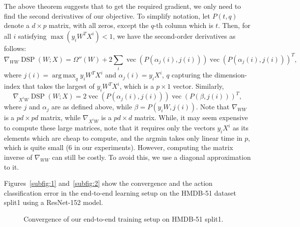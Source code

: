 \documentclass[runningheads]{llncs}
\DeclareMathOperator*{\dsp}{DSP}
\DeclareMathOperator{\vecp}{vec}
\DeclareMathOperator*{\argmax}{arg\,max}
\begin{document}
The above theorem suggests that to get the required gradient, we only need to find the second derivatives of our objective. To simplify notation, let $P(t,q)$ denote a $d\times p$ matrix, with all zeros, except the $q$-th column which is $t$. Then, for all $i$ satisfying $\max(y_iW^TX^i)<1$, we have the second-order derivatives as follows:
\begin{equation}
\nabla_{WW} \dsp(W; X) = \Omega''(W) +  2\sum_{i} \vecp\left(P\left(\alpha_j(i),j(i)\right)\right)\vecp\left(P\left(\alpha_j(i), j(i)\right)\right)^T,
\end{equation}
where $j(i)=\argmax_q y_i W^TX^i$ and $\alpha_j(i)=y_iX^i$, $q$ capturing the dimension-index that takes the largest of $y_iW^TX^i$, which is a $p\times 1$ vector. Similarly, 
\begin{equation}
\nabla_{X^iW} \dsp(W; X) = 2\vecp\left(P\left(\alpha_j(i),j(i)\right)\right)\vecp\left(P\left(\beta, j(i)\right)\right)^T,
\end{equation}
where $j$ and $\alpha_j$ are as defined above, while $\beta=P(y_iW, j(i))$. Note that $\nabla_{WW}$ is a $pd\times pd$ matrix, while $\nabla_{X^iW}$ is a $pd\times d$ matrix. While, it may seem expensive to compute these large matrices, note that it requires only the vectors $y_i X^i$ as its elements which are cheap to compute, and the argmin takes only linear time in $p$, which is quite small (6 in our experiments). However, computing the matrix inverse of $\nabla_{WW}$ can still be costly. To avoid this, we use a diagonal approximation to it. 

Figures~\ref{subfig:1} and~\ref{subfig:2} show the convergence and the action classification error in the end-to-end learning setup on the HMDB-51 dataset split1 using a ResNet-152 model.
\begin{figure}[h]
	\begin{center}
	\end{center}
	\caption{Convergence of our end-to-end training setup on HMDB-51 split1.}
\end{figure}
\end{document}
